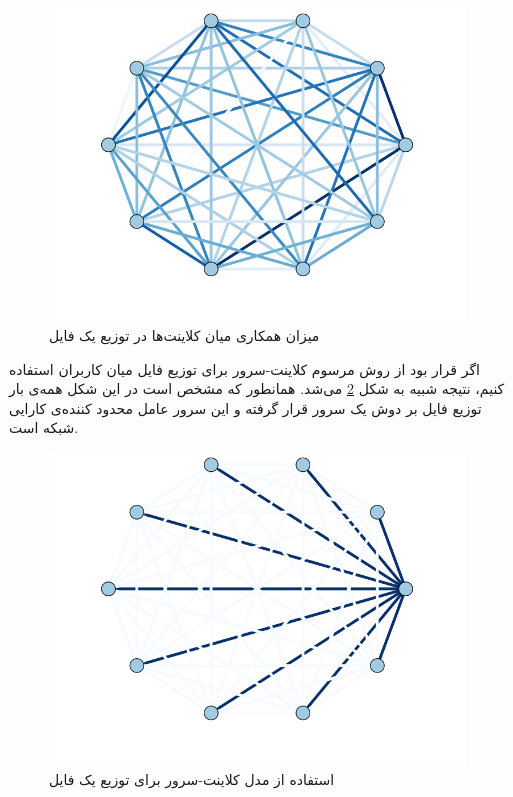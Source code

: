 \documentclass{report}
\begin{document}
\begin{figure} \centerline{\includegraphics[width=11cm]{torrent}} \caption{\label{fig:torrent}
میزان همکاری میان کلاینت‌ها در توزیع یک فایل
 } \end{figure}

اگر قرار بود از روش مرسوم کلاینت-سرور برای توزیع فایل میان کاربران استفاده کنیم، نتیجه شبیه به شکل \ref{fig:server} می‌شد. همانطور که مشخص است در این شکل همه‌ی بار توزیع فایل بر دوش یک سرور قرار گرفته و این سرور عامل محدود کننده‌ی کارایی شبکه است.

\begin{figure} \centerline{\includegraphics[width=11cm]{server}} \caption{\label{fig:server}
استفاده از مدل کلاینت-سرور برای توزیع یک فایل
 } \end{figure}
\end{document}
